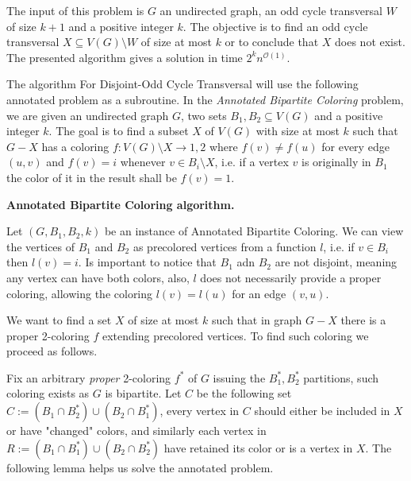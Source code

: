 The input of this problem is $G$ an undirected graph, an odd cycle transversal $W$ of size $k+1$ and a positive integer $k$.
The objective is to find an odd cycle transversal $X \subseteq V(G) \setminus W$ of size at most $k$ or to conclude that $X$ does not exist.
The presented algorithm gives a solution in time $2^{k}n^{\mathcal{O}(1)}$.

The algorithm For Disjoint-Odd Cycle Transversal will use the following annotated problem as a subroutine.
In the \emph{Annotated Bipartite Coloring} problem, we are given an undirected graph $G$, two sets $B_1,B_2 \subseteq V(G)$ and a positive integer $k$.
The goal is to find a subset $X$ of $V(G)$ with size at most $k$ such that $G-X$ has a coloring $f : V(G) \setminus X \rightarrow {1,2}$ where $f(v) \neq f(u)$ for every edge $(u,v)$
and $f(v) = i$ whenever $v \in B_i \setminus X$, i.e. if a vertex $v$ is originally in $B_1$ the color of it in the result shall be $f(v)=1$.

\textbf{Annotated Bipartite Coloring algorithm.}

Let $(G,B_1,B_2,k)$ be an instance of Annotated Bipartite Coloring.
We can view the vertices of $B_1$ and $B_2$ as precolored vertices from a function $l$, i.e. if $v \in B_i$ then $l(v)=i$.
Is important to notice that $B_1$ adn $B_2$ are not disjoint, meaning any vertex can have both colors, also, $l$ does not necessarily provide a proper coloring,
allowing the coloring $l(v)=l(u)$ for an edge $(v,u)$.

We want to find a set $X$ of size at most $k$ such that in graph $G-X$ there is a proper 2-coloring $f$ extending precolored vertices.
To find such coloring we proceed as follows.

Fix an arbitrary \emph{proper} 2-coloring $f^*$ of $G$ issuing the $B_1^*,B_2^*$ partitions, such coloring exists as $G$ is bipartite.
Let $C$ be the following set $C := (B_1 \cap B_2^*) \cup (B_2 \cap B_1^*)$, every vertex in $C$ should either be included in $X$ or have "changed" colors,
and similarly each vertex in $R := (B_1 \cap B_1^*) \cup (B_2 \cap B_2^*)$ have retained its color or is a vertex in $X$.
The following lemma helps us solve the annotated problem.

